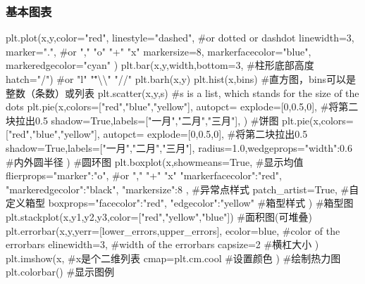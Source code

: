 \documentclass{article}
\begin{document}
      \subsubsection{基本图表}  
        \begin{codeblock}[language=python, caption={plots of plt}]
          plt.plot(x,y,color="red",
                  linestyle="dashed", #or dotted or dashdot
                  linewidth=3,
                  marker=".", #or "," "o" "+" "x"
                  markersize=8,
                  markerfacecolor="blue",
                  markeredgecolor="cyan"
          )
          plt.bar(x,y,width,bottom=3, #柱形底部高度
                  hatch="/") #or "l" "\" "\textbackslash\textbackslash" "//"
          plt.barh(x,y)
          plt.hist(x,bins) #直方图，bins可以是整数（条数）或列表
          plt.scatter(x,y,s) #s is a list, which stands for the size of the dots
          plt.pie(x,colors=["red","blue","yellow"],
                  autopct=%
                  explode=[0,0.5,0], #将第二块拉出0.5
                  shadow=True,labels=["一月","二月","三月"],
          ) #饼图
          plt.pie(x,colors=["red","blue","yellow"],
                  autopct=%
                  explode=[0,0.5,0], #将第二块拉出0.5
                  shadow=True,labels=["一月","二月","三月"],
                  radius=1.0,wedgeprops={"width":0.6} #内外圆半径
          ) #圆环图
          plt.boxplot(x,showmeans=True, #显示均值
                      flierprops={"marker":"o", #or "," "+" "x"
                                  "markerfacecolor":"red",
                                  "markeredgecolor":"black",
                                  "markersize":8
                      }, #异常点样式
                      patch_artist=True, #自定义箱型
                      boxprops={"facecolor":"red",
                                "edgecolor":"yellow"
                      } #箱型样式
          ) #箱型图
          plt.stackplot(x,y1,y2,y3,color=["red","yellow","blue"]) 
          #面积图(可堆叠)
          plt.errorbar(x,y,yerr=[lower_errors,upper_errors],
                      ecolor=blue, #color of the errorbars
                      elinewidth=3, #width of the errorbars
                      capsize=2 #横杠大小
          )
          plt.imshow(x, #x是个二维列表
                    cmap=plt.cm.cool #设置颜色
          ) #绘制热力图
          plt.colorbar() #显示图例
        \end{codeblock}
\end{document}
